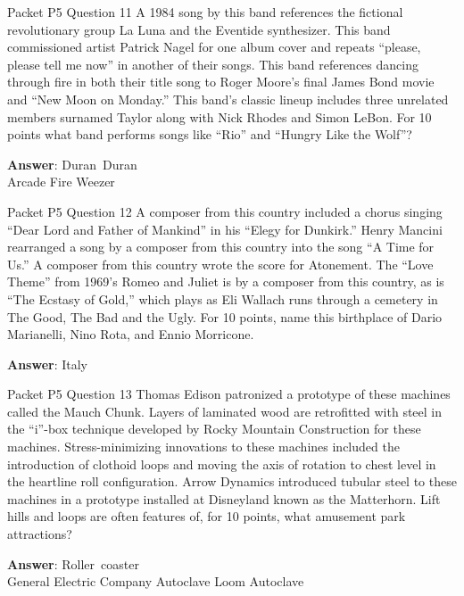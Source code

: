 \begin{frame}{Packet P5 Question 11}
A 1984 song by this band references the fictional revolutionary group La Luna and the Eventide synthesizer. This band commissioned artist Patrick Nagel for one album cover and repeats “please, please tell me now” in another of their songs. This band references dancing through fire in both their title song to Roger Moore’s final James Bond movie and “New Moon on     Monday.” This band’s classic lineup includes three unrelated members surnamed Taylor along with Nick Rhodes and Simon LeBon. For 10 points what band performs songs like “Rio” and “Hungry Like the Wolf”?    

\textbf{Answer}: Duran\ Duran\\
 Arcade Fire
 Weezer
\end{frame}

\begin{frame}{Packet P5 Question 12}
A composer from this country included a chorus singing “Dear Lord   and Father of Mankind” in his “Elegy for Dunkirk.” Henry Mancini rearranged a song by a composer from this country into the song “A Time for Us.” A composer from this country wrote the score for Atonement. The “Love Theme” from 1969’s Romeo and Juliet is by   a composer from this country, as is “The Ecstasy of Gold,”   which plays as Eli Wallach runs through a cemetery in The Good, The Bad and the Ugly. For 10 points,   name this birthplace of Dario Marianelli, Nino Rota, and Ennio Morricone.

\textbf{Answer}: Italy\\
\end{frame}

\begin{frame}{Packet P5 Question 13}
Thomas Edison patronized   a prototype of these machines called the Mauch Chunk. Layers of laminated wood are retrofitted with steel in the ``i''-box technique developed by Rocky Mountain Construction for these machines. Stress-minimizing innovations to these machines included the introduction of clothoid loops and moving the axis of rotation to chest level in the heartline roll configuration. Arrow Dynamics introduced tubular steel to these machines in a prototype installed at Disneyland known as the   Matterhorn. Lift hills and loops are often features of, for 10 points, what amusement park attractions?        

\textbf{Answer}: Roller\ coaster\\
 General Electric Company
 Autoclave
 Loom
 Autoclave
\end{frame}

